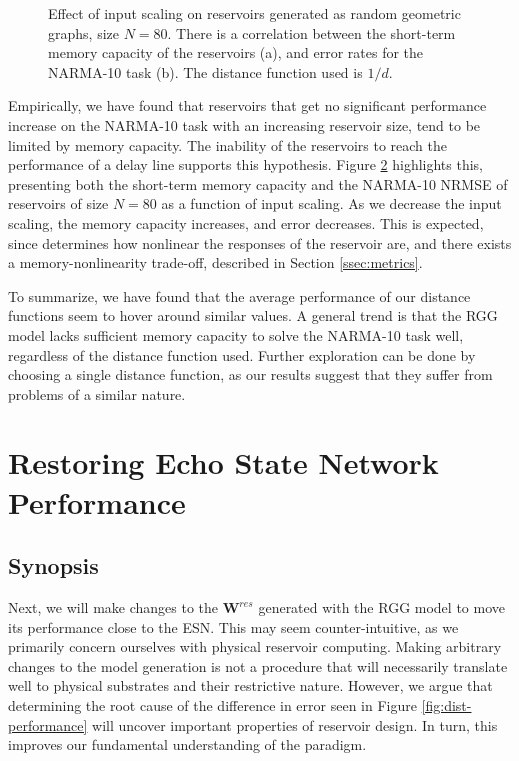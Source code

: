 \begin{figure}[t]
\begin{subfigure}{.49\textwidth}
    \caption{}
    \label{fig:dist-performance-is-b}
  \end{subfigure}
  \caption{
    Effect of input scaling on reservoirs generated as random geometric graphs,
size $N = 80$. There is a correlation between the short-term memory capacity of
the reservoirs (a), and error rates for the NARMA-10 task (b). The distance
function used is $1/d$.
  }
  \label{fig:dist-performance-is}
\end{figure}

Empirically, we have found that reservoirs that get no significant performance
increase on the NARMA-10 task with an increasing reservoir size, tend to be
limited by memory capacity. The inability of the reservoirs to reach the
performance of a delay line supports this hypothesis. Figure
\ref{fig:dist-performance-is} highlights this, presenting both the short-term
memory capacity and the NARMA-10 NRMSE of reservoirs of size $N = 80$ as a
function of input scaling. As we decrease the input scaling, the memory capacity
increases, and error decreases. This is expected, since determines how nonlinear
the responses of the reservoir are, and there exists a memory-nonlinearity
trade-off, described in Section \ref{ssec:metrics}.

To summarize, we have found that the average performance of our distance
functions seem to hover around similar values. A general trend is that the RGG
model lacks sufficient memory capacity to solve the NARMA-10 task well,
regardless of the distance function used. Further exploration can be done by
choosing a single distance function, as our results suggest that they suffer
from problems of a similar nature.


\section{Restoring Echo State Network Performance}

\subsection{Synopsis}

Next, we will make changes to the $\mathbf{W}^{res}$ generated with the RGG
model to move its performance close to the ESN. This may seem counter-intuitive,
as we primarily concern ourselves with physical reservoir computing. Making
arbitrary changes to the model generation is not a procedure that will
necessarily translate well to physical substrates and their restrictive
nature. However, we argue that determining the root cause of the difference in
error seen in Figure \ref{fig:dist-performance} will uncover important
properties of reservoir design. In turn, this improves our fundamental
understanding of the paradigm.

